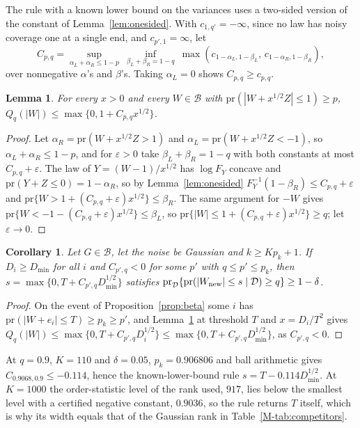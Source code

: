 \documentclass[12pt]{article}
\renewcommand{\_}{\usc\allowbreak}
\newtheorem{lemma}{Lemma}
\newtheorem{corollary}{Corollary}
\theoremstyle{definition}
\numberwithin{equation}{section}
\newcommand{\pr}{\mathrm{pr}}
\newcommand{\B}{\mathcal{B}}
\begin{document}
The rule with a known lower bound on the variances uses a two-sided version of the constant of Lemma~\ref{lem:onesided}. With $c_{1,q'} = -\infty$, since no law has noisy coverage one at a single end, and $c_{p',1} = \infty$, let
\[
C_{p,q} = \sup_{\alpha_L + \alpha_R \le 1 - p}\ \inf_{\beta_L + \beta_R = 1 - q}\ \max(c_{1 - \alpha_L, 1 - \beta_L},\, c_{1 - \alpha_R, 1 - \beta_R}),
\]
over nonnegative $\alpha$'s and $\beta$'s. Taking $\alpha_L = 0$ shows $C_{p,q} \ge c_{p,q}$.

\begin{lemma}\label{lem:twosidedC}
For every $x > 0$ and every $W \in \B$ with $\pr(|W + x^{1/2}Z| \le 1) \ge p$, $Q_q(|W|) \le \max\{0, 1 + C_{p,q}x^{1/2}\}$.
\end{lemma}

\begin{proof}
Let $\alpha_R = \pr(W + x^{1/2}Z > 1)$ and $\alpha_L = \pr(W + x^{1/2}Z < -1)$, so $\alpha_L + \alpha_R \le 1 - p$, and for $\varepsilon > 0$ take $\beta_L + \beta_R = 1 - q$ with both constants at most $C_{p,q} + \varepsilon$. The law of $Y = (W - 1)/x^{1/2}$ has $\log F_Y$ concave and $\pr(Y + Z \le 0) = 1 - \alpha_R$, so by Lemma~\ref{lem:onesided} $F_Y^{-1}(1 - \beta_R) \le C_{p,q} + \varepsilon$ and $\pr\{W > 1 + (C_{p,q} + \varepsilon)x^{1/2}\} \le \beta_R$. The same argument for $-W$ gives $\pr\{W < -1 - (C_{p,q} + \varepsilon)x^{1/2}\} \le \beta_L$, so $\pr\{|W| \le 1 + (C_{p,q} + \varepsilon)x^{1/2}\} \ge q$; let $\varepsilon \to 0$.
\end{proof}

\begin{corollary}\label{cor:simple}
Let $G \in \B$, let the noise be Gaussian and $k \ge Kp_k + 1$. If $D_i \ge D_{\min}$ for all $i$ and $C_{p',q} < 0$ for some $p'$ with $q \le p' \le p_k$, then $s = \max\{0, T + C_{p',q}D_{\min}^{1/2}\}$ satisfies $\pr_{\mathcal D}\{\pr(|W_{\rm new}| \le s \mid \mathcal D) \ge q\} \ge 1 - \delta$.
\end{corollary}

\begin{proof}
On the event of Proposition~\ref{prop:beta} some $i$ has $\pr(|W + e_i| \le T) \ge p_k \ge p'$, and Lemma~\ref{lem:twosidedC} at threshold $T$ and $x = D_i/T^2$ gives $Q_q(|W|) \le \max\{0, T + C_{p',q}D_i^{1/2}\} \le \max\{0, T + C_{p',q}D_{\min}^{1/2}\}$, as $C_{p',q} < 0$.
\end{proof}

At $q = 0.9$, $K = 110$ and $\delta = 0.05$, $p_k = 0.906806$ and ball arithmetic gives $C_{0.9068,0.9} \le -0.114$, hence the known-lower-bound rule $s = T - 0.114D_{\min}^{1/2}$. At $K = 1000$ the order-statistic level of the rank used, $917$, lies below the smallest level with a certified negative constant, $0.9036$, so the rule returns $T$ itself, which is why its width equals that of the Gaussian rank in Table~\ref{M-tab:competitors}.
\end{document}
